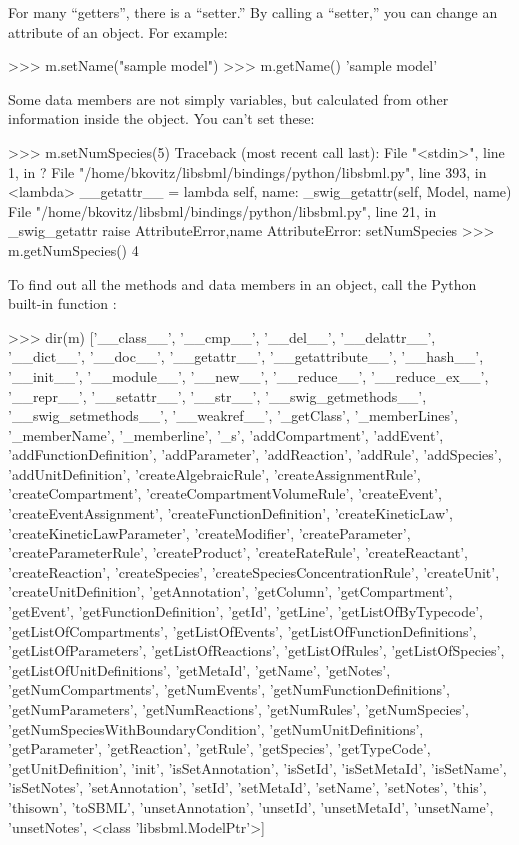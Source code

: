 \documentclass{sbmlmanual}
\begin{document}
For many ``getters'', there is a ``setter.''  By calling a
``setter,'' you can change an attribute of an  object.
For example:

\begin{shellVerbatim}
>>> m.setName("sample model")
>>> m.getName()
'sample model'
\end{shellVerbatim}

Some data members are not simply variables, but calculated
from other information inside the  object.  You can't
set these:

\begin{shellVerbatim}
>>> m.setNumSpecies(5)
Traceback (most recent call last):
  File "<stdin>", line 1, in ?
  File "/home/bkovitz/libsbml/bindings/python/libsbml.py", line 393, in <lambda>
    __getattr__ = lambda self, name: _swig_getattr(self, Model, name)
  File "/home/bkovitz/libsbml/bindings/python/libsbml.py", line 21, in _swig_getattr
    raise AttributeError,name
AttributeError: setNumSpecies
>>> m.getNumSpecies()
4
\end{shellVerbatim}

To find out all the methods and data members in an 
object, call the Python built-in function :

\begin{shellVerbatim}
>>> dir(m)
['__class__', '__cmp__', '__del__', '__delattr__', '__dict__', '__doc__',
'__getattr__', '__getattribute__', '__hash__', '__init__', '__module__',
'__new__', '__reduce__', '__reduce_ex__', '__repr__', '__setattr__',
'__str__', '__swig_getmethods__', '__swig_setmethods__', '__weakref__',
'_getClass', '_memberLines', '_memberName', '_memberline', '_s',
'addCompartment', 'addEvent', 'addFunctionDefinition', 'addParameter',
'addReaction', 'addRule', 'addSpecies', 'addUnitDefinition',
'createAlgebraicRule', 'createAssignmentRule', 'createCompartment',
'createCompartmentVolumeRule', 'createEvent', 'createEventAssignment',
'createFunctionDefinition', 'createKineticLaw', 'createKineticLawParameter',
'createModifier', 'createParameter', 'createParameterRule', 'createProduct',
'createRateRule', 'createReactant', 'createReaction', 'createSpecies',
'createSpeciesConcentrationRule', 'createUnit', 'createUnitDefinition',
'getAnnotation', 'getColumn', 'getCompartment', 'getEvent',
'getFunctionDefinition', 'getId', 'getLine', 'getListOfByTypecode',
'getListOfCompartments', 'getListOfEvents', 'getListOfFunctionDefinitions',
'getListOfParameters', 'getListOfReactions', 'getListOfRules',
'getListOfSpecies', 'getListOfUnitDefinitions', 'getMetaId', 'getName',
'getNotes', 'getNumCompartments', 'getNumEvents', 'getNumFunctionDefinitions',
'getNumParameters', 'getNumReactions', 'getNumRules', 'getNumSpecies',
'getNumSpeciesWithBoundaryCondition', 'getNumUnitDefinitions', 'getParameter',
'getReaction', 'getRule', 'getSpecies', 'getTypeCode', 'getUnitDefinition',
'init', 'isSetAnnotation', 'isSetId', 'isSetMetaId', 'isSetName',
'isSetNotes', 'setAnnotation', 'setId', 'setMetaId', 'setName', 'setNotes',
'this', 'thisown', 'toSBML', 'unsetAnnotation', 'unsetId', 'unsetMetaId',
'unsetName', 'unsetNotes', <class 'libsbml.ModelPtr'>]
\end{shellVerbatim}
\end{document}
